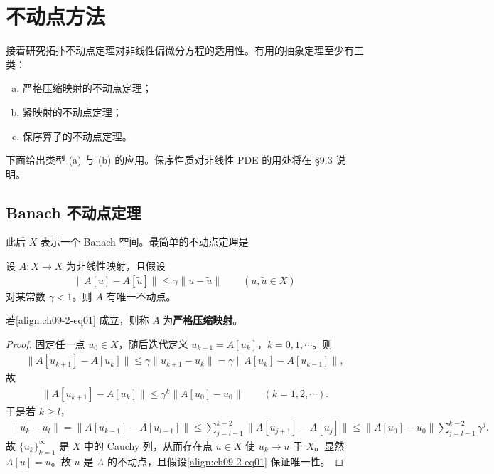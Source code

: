 \documentclass[../../main.tex]{subfiles}
\begin{document}
\section{不动点方法}\label{section:ch09-2-不动点方法}

接着研究拓扑不动点定理对非线性偏微分方程的适用性。有用的抽象定理至少有三类：
\begin{enumerate}[(a)]
\item 严格压缩映射的不动点定理；
\item 紧映射的不动点定理；
\item 保序算子的不动点定理。
\end{enumerate}
下面给出类型 (a) 与 (b) 的应用。保序性质对非线性 PDE 的用处将在 \S9.3 说明。

\subsection{Banach 不动点定理}\label{subsection:ch09-2-1-Banach}

此后 $X$ 表示一个 Banach 空间。最简单的不动点定理是

\begin{theorem}\label{theorem:ch09-2-1-Banach}
设 $A:X\to X$ 为非线性映射，且假设
\begin{align}
\|A[u]-A[\widetilde{u}]\|\leqslant\gamma\|u-\widetilde{u}\|\qquad (u,\widetilde{u}\in X)\label{align:ch09-2-eq01}
\end{align}
对某常数 $\gamma<1$。则 $A$ 有唯一不动点。
\begin{definition}
若\eqref{align:ch09-2-eq01} 成立，则称 $A$ 为\textbf{严格压缩映射}。
\end{definition}
\begin{proof}
固定任一点 $u_0\in X$，随后迭代定义 $u_{k+1}=A[u_k]$，$k=0,1,\cdots$。则
\begin{align*}
\|A[u_{k+1}]-A[u_k]\|\leqslant\gamma\|u_{k+1}-u_k\|=\gamma\|A[u_k]-A[u_{k-1}]\|,
\end{align*}
故
\begin{align*}
\|A[u_{k+1}]-A[u_k]\|\leqslant\gamma^k\|A[u_0]-u_0\|\qquad (k=1,2,\cdots).
\end{align*}
于是若 $k\geqslant l$，
\begin{align*}
\|u_k-u_l\|=\|A[u_{k-1}]-A[u_{l-1}]\|\leqslant\sum_{j=l-1}^{k-2}\|A[u_{j+1}]-A[u_j]\|\leqslant\|A[u_0]-u_0\|\sum_{j=l-1}^{k-2}\gamma^j.
\end{align*}
故 $\{u_k\}_{k=1}^\infty$ 是 $X$ 中的 Cauchy 列，从而存在点 $u\in X$ 使 $u_k\to u$ 于 $X$。显然 $A[u]=u$。故 $u$ 是 $A$ 的不动点，且假设\eqref{align:ch09-2-eq01} 保证唯一性。
\end{proof}
\end{theorem}
\end{document}
